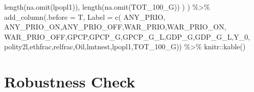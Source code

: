 \documentclass[
]{article}
\newenvironment{Shaded}{\begin{snugshade}}{\end{snugshade}}
\newcommand{\AttributeTok}[1]{\textcolor[rgb]{0.77,0.63,0.00}{#1}}
\newcommand{\FunctionTok}[1]{\textcolor[rgb]{0.00,0.00,0.00}{#1}}
\newcommand{\NormalTok}[1]{#1}
\newcommand{\SpecialCharTok}[1]{\textcolor[rgb]{0.00,0.00,0.00}{#1}}
\newcommand{\StringTok}[1]{\textcolor[rgb]{0.31,0.60,0.02}{#1}}
\begin{document}
\begin{Shaded}
\begin{Highlighting}[]
      \FunctionTok{length}\NormalTok{(}\FunctionTok{na.omit}\NormalTok{(lpopl1)),}
      \FunctionTok{length}\NormalTok{(}\FunctionTok{na.omit}\NormalTok{(TOT\_100\_G))}
\NormalTok{    )}
\NormalTok{  ) }\SpecialCharTok{\%\textgreater{}\%} 
  \FunctionTok{add\_column}\NormalTok{(}\AttributeTok{.before =}\NormalTok{ T, }\AttributeTok{Label =} \FunctionTok{c}\NormalTok{(}
    \StringTok{\textquotesingle{}ANY\_PRIO\textquotesingle{}}\NormalTok{, }\StringTok{\textquotesingle{}ANY\_PRIO\_ON\textquotesingle{}}\NormalTok{,}\StringTok{\textquotesingle{}ANY\_PRIO\_OFF\textquotesingle{}}\NormalTok{,}\StringTok{\textquotesingle{}WAR\_PRIO\textquotesingle{}}\NormalTok{,}\StringTok{\textquotesingle{}WAR\_PRIO\_ON\textquotesingle{}}\NormalTok{,}
    \StringTok{\textquotesingle{}WAR\_PRIO\_OFF\textquotesingle{}}\NormalTok{,}\StringTok{\textquotesingle{}GPCP\textquotesingle{}}\NormalTok{,}\StringTok{\textquotesingle{}GPCP\_G\textquotesingle{}}\NormalTok{,}\StringTok{\textquotesingle{}GPCP\_G\_L\textquotesingle{}}\NormalTok{,}\StringTok{\textquotesingle{}GDP\_G\textquotesingle{}}\NormalTok{,}\StringTok{\textquotesingle{}GDP\_G\_L\textquotesingle{}}\NormalTok{,}\StringTok{\textquotesingle{}Y\_0\textquotesingle{}}\NormalTok{,}
    \StringTok{\textquotesingle{}polity2l\textquotesingle{}}\NormalTok{,}\StringTok{\textquotesingle{}ethfrac\textquotesingle{}}\NormalTok{,}\StringTok{\textquotesingle{}relfrac\textquotesingle{}}\NormalTok{,}\StringTok{\textquotesingle{}Oil\textquotesingle{}}\NormalTok{,}\StringTok{\textquotesingle{}lmtnest\textquotesingle{}}\NormalTok{,}\StringTok{\textquotesingle{}lpopl1\textquotesingle{}}\NormalTok{,}\StringTok{\textquotesingle{}TOT\_100\_G\textquotesingle{}}\NormalTok{)) }\SpecialCharTok{\%\textgreater{}\%} 
\NormalTok{  knitr}\SpecialCharTok{::}\FunctionTok{kable}\NormalTok{()}
\end{Highlighting}
\end{Shaded}

\hypertarget{robustness-check}{%
\section{Robustness Check}\label{robustness-check}}
\end{document}
